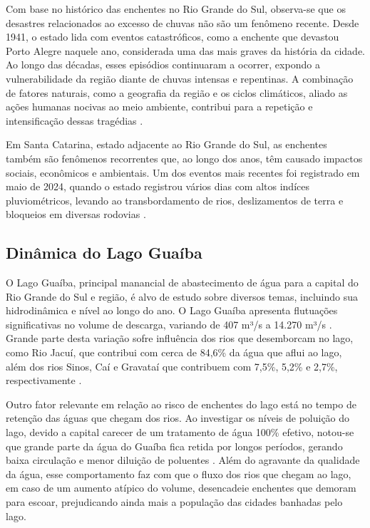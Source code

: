 Com base no histórico das enchentes no Rio Grande do Sul, observa-se que os desastres relacionados ao excesso de chuvas não são um fenômeno recente. Desde 1941, o estado lida com eventos catastróficos, como a enchente que devastou Porto Alegre naquele ano, considerada uma das mais graves da história da cidade. Ao longo das décadas, esses episódios continuaram a ocorrer, expondo a vulnerabilidade da região diante de chuvas intensas e repentinas. A combinação de fatores naturais, como a geografia da região e os ciclos climáticos, aliado as ações humanas nocivas ao meio ambiente, contribui para a repetição e intensificação dessas tragédias \cite{veja2024}.

Em Santa Catarina, estado adjacente ao Rio Grande do Sul, as enchentes também são fenômenos recorrentes que, ao longo dos anos, têm causado impactos sociais, econômicos e ambientais. Um dos eventos mais recentes foi registrado em maio de 2024, quando o estado registrou vários dias com altos indíces pluviométricos, levando ao transbordamento de rios, deslizamentos de terra e bloqueios em diversas rodovias \cite{g12024}.

\subsection{Dinâmica do Lago Guaíba}

O Lago Guaíba, principal manancial de abastecimento de água para a capital do Rio Grande do Sul e região, é alvo de estudo sobre diversos temas, incluindo sua hidrodinâmica e nível ao longo do ano. O Lago Guaíba apresenta flutuações significativas no volume de descarga, variando de 407 m³/s a 14.270 m³/s \cite{andrade2017}. Grande parte desta variação sofre influência dos rios que desemborcam no lago, como Rio Jacuí, que contribui com cerca de 84,6\% da água que aflui ao lago, além dos rios Sinos, Caí e Gravataí que contribuem com 7,5\%, 5,2\% e 2,7\%, respectivamente \cite{andrade2019}. 

Outro fator relevante em relação ao risco de enchentes do lago está no tempo de retenção das águas que chegam dos rios. Ao investigar os níveis de poluição do lago, devido a capital carecer de um tratamento de água 100\% efetivo, notou-se que grande parte da água do Guaíba fica retida por longos períodos, gerando baixa circulação e menor diluição de poluentes \cite{andrade2019}. Além do agravante da qualidade da água, esse comportamento faz com que o fluxo dos rios que chegam ao lago, em caso de um aumento atípico do volume, desencadeie enchentes que demoram para escoar, prejudicando ainda mais a população das cidades banhadas pelo lago. 

